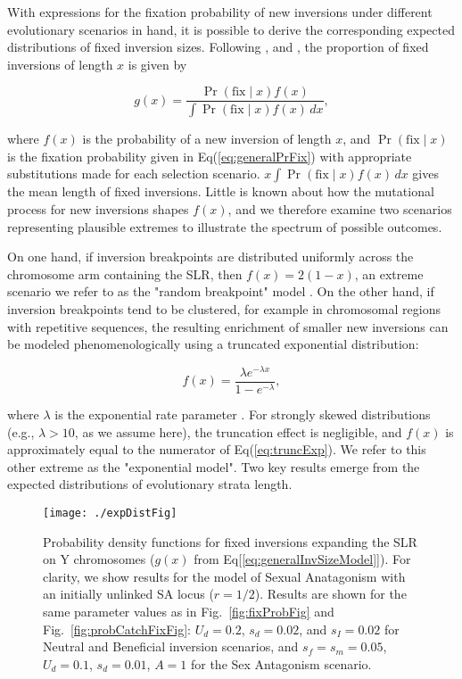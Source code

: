 \documentclass{article}
\begin{document}
With expressions for the fixation probability of new inversions under different evolutionary scenarios in hand, it is possible to derive the corresponding expected distributions of fixed inversion sizes. Following \citet{vanValenLevins1968, Santos1986}, and \citet{ConnallonOlito2020}, the proportion of fixed inversions of length $x$ is given by 

\begin{equation} \label{eq:generalInvSizeModel}
	g(x) = \frac{\Pr(\text{fix} \mid x) f(x)} {\int \Pr(\text{fix} \mid x) f(x)\,dx},
\end{equation}

\noindent where $f(x)$ is the probability of a new inversion of length $x$, and $\Pr(\text{fix} \mid x)$ is the fixation probability given in Eq(\ref{eq:generalPrFix}) with appropriate substitutions made for each selection scenario. $x\int \Pr(\text{fix} \mid x) f(x)\,dx$ gives the mean length of fixed inversions. Little is known about how the mutational process for new inversions shapes $f(x)$, and we therefore examine two scenarios representing plausible extremes to illustrate the spectrum of possible outcomes.

On one hand, if inversion breakpoints are distributed uniformly across the chromosome arm containing the SLR, then $f(x) = 2(1 - x)$, an extreme scenario we refer to as the "random breakpoint" model \citep{vanValenLevins1968}. On the other hand, if inversion breakpoints tend to be clustered, for example in chromosomal regions with repetitive sequences, the resulting enrichment of smaller new inversions can be modeled phenomenologically using a truncated exponential distribution:

\begin{equation} \label{eq:truncExp}
	f(x) = \frac{ \lambda e^{-\lambda x}} {1 - e^{-\lambda}},
\end{equation}

\noindent where $\lambda$ is the exponential rate parameter \citep{PevznerTesler2003, PengPevznerTesler2006, ChengKirkpatrick2019,ConnallonOlito2020}. For strongly skewed distributions (e.g., $\lambda > 10$, as we assume here), the truncation effect is negligible, and $f(x)$ is approximately equal to the numerator of Eq(\ref{eq:truncExp}). We refer to this other extreme as the "exponential model". Two key results emerge from the expected distributions of evolutionary strata length.


 \begin{figure}[htbp]
 \centering
 \texttt{[image: ./expDistFig]}
 \caption{Probability density functions for fixed inversions expanding the SLR on Y chromosomes ($g(x)$ from Eq[\ref{eq:generalInvSizeModel}]). For clarity, we show results for the model of Sexual Anatagonism with an initially unlinked SA locus ($r = 1/2$). Results are shown for the same parameter values as in Fig.~\ref{fig:fixProbFig} and Fig.~\ref{fig:probCatchFixFig}: $U_d = 0.2$, $s_d = 0.02$, and $s_I = 0.02$ for Neutral and Beneficial inversion scenarios, and $s_f = s_m = 0.05$, $U_d = 0.1$, $s_d = 0.01$, $A = 1$ for the Sex Antagonism scenario.}
 \label{fig:ExpectedDistFig}
 \end{figure}
\end{document}
